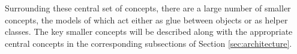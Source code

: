 
Surrounding these central set of concepts, there are a large number of
smaller concepts, the models of which act either as glue between
objects or as helper classes.  The key smaller concepts will be described along
with the appropriate central concepts in the corresponding subsections
of Section \ref{sec:architecture}.



